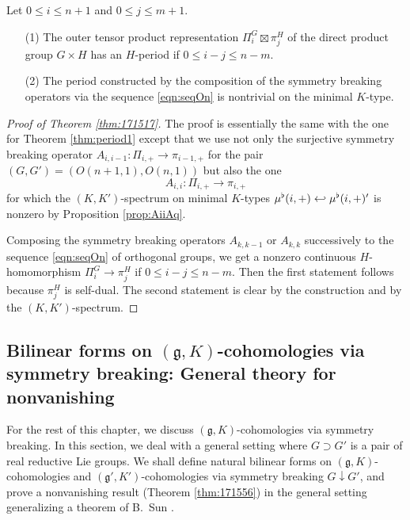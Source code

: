 \begin{theorem}
\label{thm:171517}
Let $0 \le i \le n+1$ and $0 \le j \le m+1$.  
\begin{enumerate}
\item[{\rm{(1)}}]
The outer tensor product representation $\Pi_i^G \boxtimes \pi_j^H$ 
 of the direct product group $G \times H$ has an $H$-period if $0 \le i -j \le n-m$.  
\item[{\rm{(2)}}]
The period constructed 
 by the composition of the symmetry breaking operators 
 via the sequence \eqref{eqn:seqOn} 
 is nontrivial on the minimal $K$-type.  
\end{enumerate}
\end{theorem}



\begin{proof}
[Proof of Theorem \ref{thm:171517}]
The proof is essentially the same  
 with the one for Theorem \ref{thm:period1}
 except
 that we use not only the surjective symmetry breaking operator
 $A_{i,i-1} \colon \Pi_{i,+} \to \pi_{i-1,+}$
 for the pair $(G,G')=(O(n+1,1),O(n,1))$
but also the one 
\[
  A_{i,i} \colon \Pi_{i,+} \to \pi_{i,+}
\]
for which the $(K,K')$-spectrum
 on minimal $K$-types $\mu^{\flat}(i,+)\hookleftarrow \mu^{\flat}(i,+)'$
 is nonzero by Proposition \ref{prop:AiiAq}.  



Composing the symmetry breaking operators $A_{k,k-1}$ or $A_{k,k}$ successively
 to the sequence \eqref{eqn:seqOn} of orthogonal groups, 
 we get a nonzero continuous $H$-homomorphism
 $\Pi_i^G \to \pi_j^H$ 
 if $0 \le i-j \le n-m$.  
Then the first statement follows 
 because $\pi_j^H$ is self-dual.  
The second statement is clear by the construction
 and by the $(K,K')$-spectrum.   
\end{proof}


\subsection{Bilinear forms
 on $({\mathfrak{g}},K)$-cohomologies via symmetry breaking: General theory for nonvanishing}
For the rest of this chapter,
 we discuss $({\mathfrak{g}},K)$-cohomologies
 via symmetry breaking.  
In this section,
 we deal with a general setting
 where $G \supset G'$ is a pair of real reductive Lie groups.  
We shall define natural bilinear forms
 on $({\mathfrak{g}},K)$-cohomologies
 and $({\mathfrak{g}}',K')$-cohomologies
 via symmetry breaking $G \downarrow G'$, 
 and prove a nonvanishing result
 (Theorem \ref{thm:171556}) in the general setting generalizing a theorem of B.~Sun \cite{ S}.  
